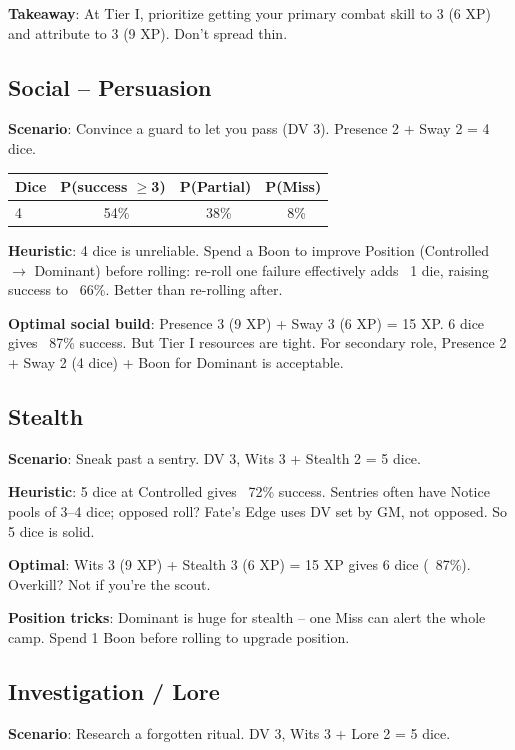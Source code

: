 \documentclass[11pt]{article}
\begin{document}
\textbf{Takeaway}: At Tier I, prioritize getting your primary combat skill to 3 (6 XP) and attribute to 3 (9 XP). Don't spread thin.

\subsection{Social -- Persuasion}
\textbf{Scenario}: Convince a guard to let you pass (DV 3). Presence 2 + Sway 2 = 4 dice.

\begin{table}[h]
\centering
\begin{tabular}{lccc}
\toprule
\textbf{Dice} & \textbf{P(success $\geq$3)} & \textbf{P(Partial)} & \textbf{P(Miss)} \\
\midrule
4 & ~54\% & ~38\% & ~8\% \\
\bottomrule
\end{tabular}
\end{table}

\textbf{Heuristic}: 4 dice is unreliable. Spend a Boon to improve Position (Controlled $\rightarrow$ Dominant) before rolling: re-roll one failure effectively adds ~1 die, raising success to ~66\%. Better than re-rolling after.

\textbf{Optimal social build}: Presence 3 (9 XP) + Sway 3 (6 XP) = 15 XP. 6 dice gives ~87\% success. But Tier I resources are tight. For secondary role, Presence 2 + Sway 2 (4 dice) + Boon for Dominant is acceptable.

\subsection{Stealth}
\textbf{Scenario}: Sneak past a sentry. DV 3, Wits 3 + Stealth 2 = 5 dice.

\textbf{Heuristic}: 5 dice at Controlled gives ~72\% success. Sentries often have Notice pools of 3--4 dice; opposed roll? Fate's Edge uses DV set by GM, not opposed. So 5 dice is solid.

\textbf{Optimal}: Wits 3 (9 XP) + Stealth 3 (6 XP) = 15 XP gives 6 dice (~87\%). Overkill? Not if you're the scout.

\textbf{Position tricks}: Dominant is huge for stealth -- one Miss can alert the whole camp. Spend 1 Boon before rolling to upgrade position.

\subsection{Investigation / Lore}
\textbf{Scenario}: Research a forgotten ritual. DV 3, Wits 3 + Lore 2 = 5 dice.
\end{document}
